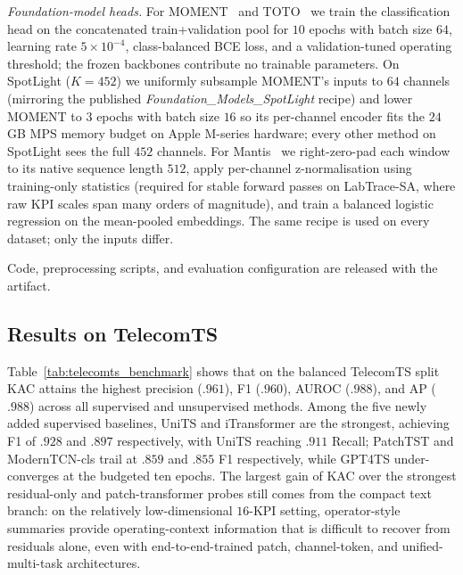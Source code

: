 \documentclass[conference]{IEEEtran}
\begin{document}
\emph{Foundation-model heads.} For MOMENT~\cite{goswami2024moment} and TOTO~\cite{cohen2025toto} we train the classification head on the concatenated train+validation pool for $10$ epochs with batch size $64$, learning rate $5{\times}10^{-4}$, class-balanced BCE loss, and a validation-tuned operating threshold; the frozen backbones contribute no trainable parameters. On SpotLight ($K{=}452$) we uniformly subsample MOMENT's inputs to $64$ channels (mirroring the published \textit{Foundation\_Models\_SpotLight} recipe) and lower MOMENT to $3$ epochs with batch size $16$ so its per-channel encoder fits the $24$\,GB MPS memory budget on Apple M-series hardware; every other method on SpotLight sees the full $452$ channels. For Mantis~\cite{feofanov2025mantis} we right-zero-pad each window to its native sequence length $512$, apply per-channel z-normalisation using training-only statistics (required for stable forward passes on LabTrace-SA, where raw KPI scales span many orders of magnitude), and train a balanced logistic regression on the mean-pooled embeddings. The same recipe is used on every dataset; only the inputs differ.

Code, preprocessing scripts, and evaluation configuration are released with the artifact.

\subsection{Results on TelecomTS}
\label{sec:res_telecomts}

Table~\ref{tab:telecomts_benchmark} shows that on the balanced TelecomTS split KAC attains the highest precision ($.961$), F1 ($.960$), AUROC ($.988$), and AP ($.988$) across all supervised and unsupervised methods. Among the five newly added supervised baselines, UniTS and iTransformer are the strongest, achieving F1 of $.928$ and $.897$ respectively, with UniTS reaching $.911$ Recall; PatchTST and ModernTCN-cls trail at $.859$ and $.855$ F1 respectively, while GPT4TS under-converges at the budgeted ten epochs. The largest gain of KAC over the strongest residual-only and patch-transformer probes still comes from the compact text branch: on the relatively low-dimensional $16$-KPI setting, operator-style summaries provide operating-context information that is difficult to recover from residuals alone, even with end-to-end-trained patch, channel-token, and unified-multi-task architectures.
\end{document}
